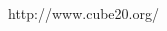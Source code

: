 \documentclass[11pt,a4paper]{article}
\begin{document}








\begin{thebibliography}{9}

  http://www.cube20.org/
  
\end{thebibliography}
\end{document}
